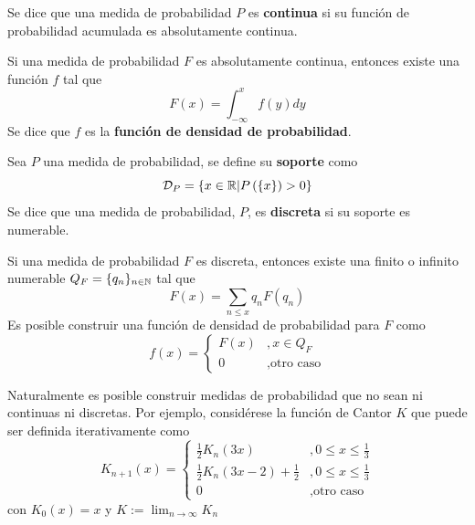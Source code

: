 Se dice que una medida de probabilidad $P$ es \textbf{continua} si su función de probabilidad acumulada es absolutamente continua.

Si una medida de probabilidad $F$ es absolutamente continua, entonces existe una función $f$ tal que 
\begin{equation}
F(x) = \int_{-\infty}^{x}f(y) dy
\end{equation}
Se dice que $f$ es la \textbf{función de densidad de probabilidad}.

Sea $P$ una medida de probabilidad, se define su \textbf{soporte} como
\begin{equation}
\mathcal{D}_P = \left\{ x\in \mathbb{R} \lvert P\left( \left\{ x\right\} \right)>0 \right\}
\end{equation}
%
Se dice que una medida de probabilidad, $P$, es \textbf{discreta} si su soporte es numerable.

Si una medida de probabilidad $F$ es discreta, entonces existe una finito o infinito numerable $Q_F=\{q_n\}_{n\in \mathbb{N}}$ tal que 
\begin{equation}
F(x) = \sum_{n\leq x} q_n F({q_n})
\end{equation}
Es posible construir una función de densidad de probabilidad para $F$ como
\begin{equation}
f(x) = \begin{cases}
F({x}) &, x\in Q_F \\
0 &, \text{otro caso}
\end{cases}
\end{equation}

Naturalmente es posible construir medidas de probabilidad que no sean ni continuas ni discretas. Por ejemplo, considérese la función de Cantor $K$ que puede ser definida iterativamente como
\begin{equation}
K_{n+1}(x) =
\begin{cases}
\frac{1}{2} K_n(3 x) &, 0\leq x \leq \frac{1}{3} \\
\frac{1}{2} K_n(3 x-2) + \frac{1}{2} &, 0\leq x \leq \frac{1}{3} \\
0 &, \text{otro caso}
\end{cases}
\end{equation}
con $K_0(x) = x$ y $K := \lim_{n\rightarrow \infty} K_n$

